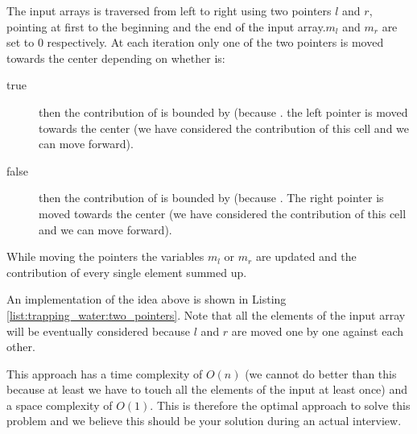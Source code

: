 The input arrays is traversed from left to right using two pointers $l$ and $r$, pointing at first to the beginning and the end of the input array.$m_l$ and $m_r$ are set to $0$ respectively. At each iteration only one of the two pointers is moved towards the center depending on whether  is:
\begin{description}
\item[true]  then the contribution of  is bounded by  (because . the left pointer is moved towards the center (we have considered the contribution of this cell and we can move forward).\\
\item[false] then the contribution of  is bounded by  (because . The right pointer is moved towards the center (we have considered the contribution of this cell and we can move forward). \\
\end{description}

While moving the pointers the variables $m_l$ or $m_r$ are updated and the contribution of every single element summed up.

An implementation of the idea above is shown in Listing \ref{list:trapping_water:two_pointers}. Note that all the elements of the input array will be eventually considered because $l$ and $r$ are moved one by one against each other. 



This approach has a time complexity of $O(n)$ (we cannot do better than this because at least we have to touch all the elements of the input at least once) and a space complexity of $O(1)$. This is therefore the optimal approach to solve this problem  and we believe this should be your solution during an actual interview.
